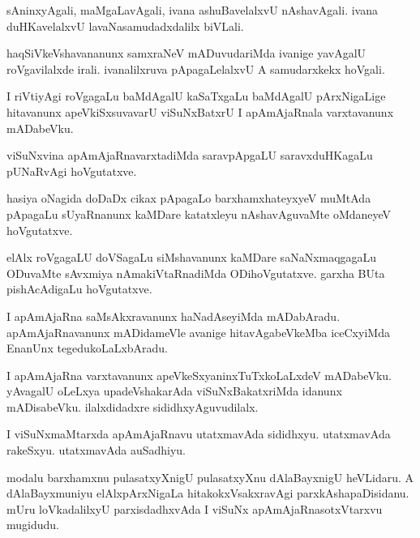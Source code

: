 \documentclass{article}
\begin{document}
\begin{mn}%
sAninxyAgali, maMgaLavAgali, ivana ashuBavelalxvU nAshavAgali. ivana duHKavelalxvU 
lavaNasamudadxdalilx biVLali.
\end{mn}

\begin{mn}%
haqSiVkeVshavananunx samxraNeV mADuvudariMda ivanige yavAgalU roVgavilalxde irali. ivanalilxruva 
pApagaLelalxvU A samudarxkekx hoVgali.
\end{mn}

\begin{mn}%
I riVtiyAgi roVgagaLu baMdAgalU kaSaTxgaLu baMdAgalU pArxNigaLige hitavanunx apeVkiSxsuvavarU 
viSuNxBatxrU I apAmAjaRnala varxtavanunx mADabeVku.
\end{mn}

\begin{mn}%
viSuNxvina apAmAjaRnavarxtadiMda saravpApgaLU saravxduHKagaLu pUNaRvAgi hoVgutatxve.
\end{mn}

\begin{mn}%
hasiya oNagida doDaDx cikax pApagaLo barxhamxhateyxyeV muMtAda pApagaLu sUyaRnanunx kaMDare 
katatxleyu nAshavAguvaMte oMdaneyeV hoVgutatxve.
\end{mn}

\begin{mn}%
elAlx roVgagaLU doVSagaLu siMshavanunx kaMDare saNaNxmaqgagaLu ODuvaMte sAvxmiya nAmakiVtaRnadiMda 
ODihoVgutatxve. garxha BUta pishAcAdigaLu hoVgutatxve.
\end{mn}

\begin{mn}%
I apAmAjaRna saMsAkxravanunx haNadAseyiMda mADabAradu. apAmAjaRnavanunx mADidameVle avanige 
hitavAgabeVkeMba iceCxyiMda EnanUnx tegedukoLaLxbAradu.
\end{mn}

\begin{mn}%
I apAmAjaRna varxtavanunx apeVkeSxyaninxTuTxkoLaLxdeV mADabeVku. yAvagalU oLeLxya upadeVshakarAda 
viSuNxBakatxriMda idanunx mADisabeVku. ilalxdidadxre sididhxyAguvudilalx.
\end{mn}

\begin{mn}%
I viSuNxmaMtarxda apAmAjaRnavu utatxmavAda sididhxyu. utatxmavAda rakeSxyu. utatxmavAda auSadhiyu.
\end{mn}

\begin{mn}%
modalu barxhamxnu pulasatxyXnigU pulasatxyXnu dAlaBayxnigU heVLidaru. A dAlaBayxmuniyu 
elAlxpArxNigaLa hitakokxVsakxravAgi parxkAshapaDisidanu. mUru loVkadalilxyU parxisdadhxvAda I 
viSuNx apAmAjaRnasotxVtarxvu mugidudu.
\end{mn}
\end{document}
